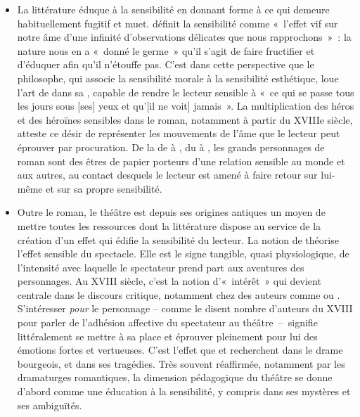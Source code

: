 {\begin{itemize}
\item La littérature éduque à la sensibilité en donnant forme à ce qui demeure
habituellement fugitif et muet.  définit la sensibilité comme «~l'effet vif sur
notre âme d'une infinité d'observations délicates que nous rapprochons~»~: la
nature nous en a «~donné le germe~» qu'il s'agit de faire fructifier et d'éduquer afin qu'il n'étouffe pas. C'est dans cette perspective que le philosophe, qui associe la
sensibilité morale à la sensibilité esthétique, loue l'art de  dans sa
, capable de rendre le lecteur sensible à «~ce qui se passe tous les jours
sous [ses] yeux et qu'[il ne voit] jamais~». La multiplication des héros et des
héroïnes sensibles dans le roman, notamment à partir du XVIIIe siècle, atteste ce
désir de représenter les mouvements de l'âme que le lecteur peut éprouver par
procuration. De la  de  à , du  à
, les grands personnages de roman sont des êtres de papier porteurs
d'une relation sensible au monde et aux autres, au contact desquels le lecteur est
amené à faire retour sur lui-même et sur sa propre sensibilité.

\item Outre le roman, le théâtre est depuis ses origines antiques un moyen de mettre
toutes les ressources dont la littérature dispose au service de la création d'un effet
qui édifie la sensibilité du lecteur. La notion de  théorise l'effet sensible du
spectacle. Elle est le signe tangible, quasi physiologique, de l'intensité avec
laquelle le spectateur prend part aux aventures des personnages. Au XVIII\ieme{} siècle,
c'est la notion d'«~intérêt~» qui devient centrale dans le discours critique, notamment
chez des auteurs comme  ou . S'intéresser \emph{pour} le personnage --
comme le disent nombre d'auteurs du XVIII\ieme{} pour parler de l'adhésion affective du
spectateur au théâtre~--~signifie littéralement se mettre à sa place et éprouver
pleinement pour lui des émotions fortes et vertueuses. C'est l'effet que  et
 recherchent dans le drame bourgeois, et  dans ses
tragédies. Très souvent réaffirmée, notamment par les dramaturges romantiques,
la dimension pédagogique du théâtre se donne d'abord comme une éducation à la
sensibilité, y compris dans ses mystères et ses ambiguïtés.


\end{itemize}}
